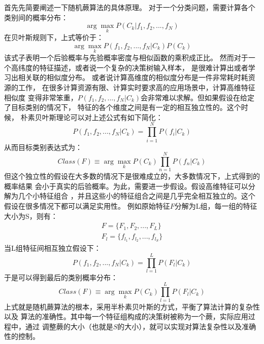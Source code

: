 首先先简要阐述一下随机蕨算法的具体原理。
对于一个分类问题，需要计算各个类别间的概率分布：
\begin{equation}
	\arg\max_{k} P(C_k|f_1,f_2,...,f_N)
\end{equation}
在贝叶斯规则下，上式等价于：
\begin{equation}
	\arg\max_{k} P(f_1,f_2,...,f_N|C_k)P(C_k)
\end{equation}
该式子表明一个后验概率与先验概率密度与相似函数的乘积成正比。
然而对于一个高纬度的特征描述，或者说一个复杂的决策树输入样本，
是很难计算出或者学习出相关联的相似度分布。
或者说计算高维度的相似度分布是一件非常耗时耗资源的工作，
在很多计算资源有限、计算实时要求高的应用场景中，计算高维特征相似度
变得非常笨重，$P(f_1,f_2,...,f_N|C_k)$会非常难以求解。但如果假设在给定了目标类别的情况下，
特征的各个维度之间是有一定的相互独立性的。这个时候，
朴素贝叶斯理论可以对上述公式有如下简化：
\begin{equation}
	P(f_1,f_2,...,f_N|C_k)=\prod_{i=1}^N P(f_i|C_k)
\end{equation}
从而目标类别表达式为：
\begin{equation}
	Class(F)\equiv \arg\max_k P(C_k)\prod_{n=1}^N P(f_n|C_k)
\end{equation}
但这个独立性的假设在大多数的情况下是很难成立的，大多数情况下，上式得到的概率结果
会小于真实的后验概率。为此，需要进一步假设。假设高维特征可以分解为几个小特征组合
，并且这些小的特征组合之间是几乎完全相互独立的。这个假设在很多情况下都可以满足实用性。
例如原始特征$F$分解为L组，每一组的特征大小为S，则有：
\begin{equation}
\begin{aligned}
	F=\{F_1,F_2,...,F_L\} \\
	F_l=\{f_{l_1},f_{l_2},...,f_{l_S}\}
\end{aligned}
\end{equation}
当L组特征间相互独立假设下：
\begin{equation}
	P(f_1,f_2,...,f_N|C_k)=\prod_{l=1}^L P(F_l|C_k)
\end{equation}
于是可以得到最后的类别概率分布：
\begin{equation}
	Class(F)\equiv \arg\max_k P(C_k)\prod_{l=1}^L P(F_l|C_k)
\end{equation}
上式就是随机蕨算法的根本，采用半朴素贝叶斯的方式，平衡了算法计算的复杂性以及
算法的准确性。其中每一个特征组构成的决策树被称为一个蕨，实际应用过程中，通过
调整蕨的大小（也就是$S$的大小），就可以实现对算法复杂性以及准确性的控制。

